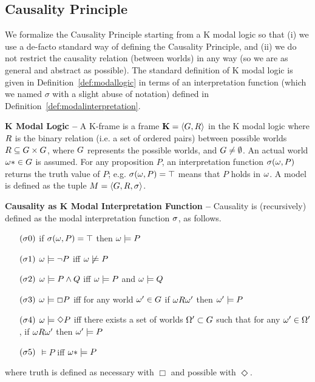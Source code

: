 \subsection{Causality Principle}\label{sec:causality}
We formalize the Causality Principle starting from a K modal
logic\autocite{Garson2018modal} so that (i) we use a de-facto standard
way of defining the Causality Principle, and (ii) we do not restrict the causality
relation (between worlds) in any way (so we are as general and abstract as possible).
The standard definition of K modal logic is given in
Definition~\ref{def:modallogic} in terms of an interpretation function (which
we named $\sigma$ with a slight abuse of notation) defined in
Definition~\ref{def:modalinterpretation}. 
\begin{definition}{\bf K Modal Logic --}\label{def:modallogic}
A K-frame is a frame $ \mathbf{K}=\langle G,R \rangle $
	in the K modal logic where $ R $ is the binary relation
	(i.e. a set of ordered pairs) between possible worlds
	$R\subseteq G\times G$, where
	$G$ represents the possible worlds, and
	$G\neq\emptyset$. An actual world
	$\omega*\in G$ is assumed. For any proposition $P$,
	an interpretation function $\sigma(\omega,P)$ returns the
	truth value of $P$; e.g. $\sigma(\omega,P)=\top$ means that
	$P$ holds in $\omega$. A model is defined as the tuple
	$M=\langle G,R,\sigma\rangle$.
\end{definition}

\begin{definition}{\bf Causality as K Modal Interpretation Function --}\label{def:modalinterpretation}
	Causality is (recursively) defined as the modal interpretation function $\sigma$, as follows. 
	\begin{enumerate}[noitemsep]
		\item[$(\sigma0)$] if $\sigma(\omega,P)=\top$ then $\omega\models P$
		\item[$(\sigma1)$] $\omega\models\neg P$ iff $\omega\not\models P$
		\item[$(\sigma2)$] $\omega\models P \wedge Q$ iff $\omega\models P$ and $\omega\models Q$
		\item[$(\sigma3)$] $\omega\models\Box P$ iff for any world $\omega'\in G$ if $\omega R\omega'$ then $\omega'\models P$
		\item[$(\sigma4)$] $\omega\models\Diamond P$ iff there exists a set of worlds $\Omega'\subset G$ such that for any $\omega'\in\Omega'$, if $\omega R\omega'$ then $\omega'\models P$
		\item[$(\sigma5)$] $\models P$ iff $\omega*\models P$
	\end{enumerate}
	where truth is defined as necessary with $\Box$ and possible with $\Diamond$.
\end{definition}

